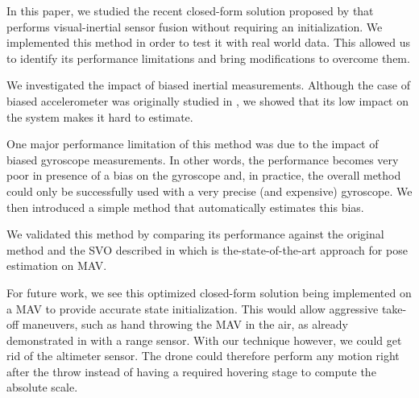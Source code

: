 \documentclass[letterpaper, 10 pt, conference]{ieeeconf}  %
\begin{document}
In this paper, we studied the recent closed-form solution proposed by \cite{Martinelli2014} that performs visual-inertial sensor fusion without requiring an initialization.
We implemented this method in order to test it with real world data.
This allowed us to identify its performance limitations and bring modifications to overcome them.

We investigated the impact of biased inertial measurements.
Although the case of biased accelerometer was originally studied in \cite{Martinelli2014}, we showed that its low impact on the system makes it hard to estimate.

One major performance limitation of this method was due to the impact of biased gyroscope measurements.
In other words, the performance becomes very poor in presence of a bias on the gyroscope and, in practice, the overall method could only be successfully used with a very precise (and expensive) gyroscope.
We then introduced a simple method that automatically estimates this bias.



We validated this method by comparing its performance against the original method and the SVO described in \cite{FaesslerICRA15} which is the-state-of-the-art approach for pose estimation on MAV.

For future work, we see this optimized closed-form solution being implemented on a MAV to provide accurate state initialization.
This would allow aggressive take-off maneuvers, such as hand throwing the MAV in the air, as already demonstrated in \cite{Faessler2015} with a range sensor.
With our technique however, we could get rid of the altimeter sensor.
The drone could therefore perform any motion right after the throw instead of having a required hovering stage to compute the absolute scale.



\end{document}
